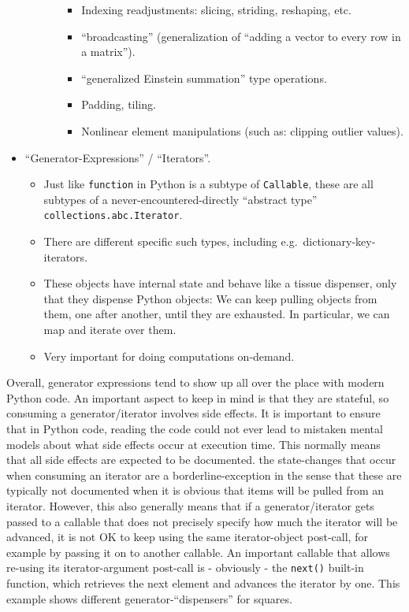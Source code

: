 \documentclass[11pt]{article}
\providecommand{\tightlist}{%
      \setlength{\itemsep}{0pt}\setlength{\parskip}{0pt}}
\begin{document}
\begin{itemize}
\begin{itemize}
\begin{itemize}
      \begin{itemize}
      \tightlist
      \item
        Indexing readjustments: slicing, striding, reshaping, etc.
      \item
        ``broadcasting'' (generalization of ``adding a vector to every
        row in a matrix'').
      \item
        ``generalized Einstein summation'' type operations.
      \item
        Padding, tiling.
      \item
        Nonlinear element manipulations (such as: clipping outlier
        values).
      \end{itemize}
    \end{itemize}
  \end{itemize}
\item
  ``Generator-Expressions'' / ``Iterators''.

  \begin{itemize}
  \item
    Just like \texttt{function} in Python is a subtype of
    \texttt{Callable}, these are all subtypes of a
    never-encountered-directly ``abstract type''
    \texttt{collections.abc.Iterator}.
  \item
    There are different specific such types, including
    e.g.~dictionary-key-iterators.
  \item
    These objects have internal state and behave like a tissue
    dispenser, only that they dispense Python objects: We can keep
    pulling objects from them, one after another, until they are
    exhausted. In particular, we can map and iterate over them.
  \item
    Very important for doing computations on-demand.
  \end{itemize}
\end{itemize}

Overall, generator expressions tend to show up all over the place with
modern Python code. An important aspect to keep in mind is that they are
stateful, so consuming a generator/iterator involves side effects. It is
important to ensure that in Python code, reading the code could not ever
lead to mistaken mental models about what side effects occur at
execution time. This normally means that all side effects are expected
to be documented. the state-changes that occur when consuming an
iterator are a borderline-exception in the sense that these are
typically not documented when it is obvious that items will be pulled
from an iterator. However, this also generally means that if a
generator/iterator gets passed to a callable that does not precisely
specify how much the iterator will be advanced, it is not OK to keep
using the same iterator-object post-call, for example by passing it on
to another callable. An important callable that allows re-using its
iterator-argument post-call is - obviously - the \texttt{next()}
built-in function, which retrieves the next element and advances the
iterator by one. This example shows different generator-``dispensers''
for squares.
\end{document}
